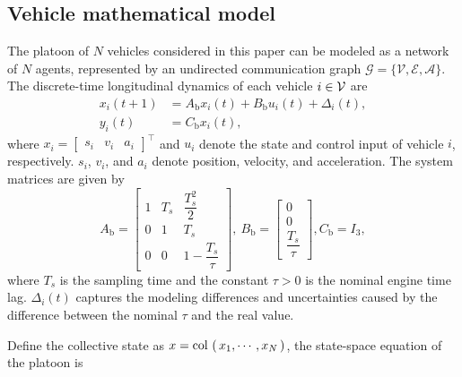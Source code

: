 \subsection{Vehicle mathematical model}\label{sec_vehiclemodel}
\vspace*{-0.3cm}
The platoon of $N$ vehicles considered in this paper can be modeled as a network of $N$ agents, represented by an undirected communication graph $\mathcal{G} = \{\mathcal{V}, \mathcal{E}, \mathcal{A}\}$.
The discrete-time longitudinal dynamics of each vehicle $i \in \mathcal{V}$ are
\begin{equation}\label{v_i}
    \begin{aligned}
        x_i(t+1) &= A_{\text{b}} x_i(t) + B_{\text{b}}u_{i}(t) + \Delta_i(t),\\
        y_i(t) &= C_{\text{b}} x_i(t),
    \end{aligned} 
\end{equation}
where $x_i=\begin{bmatrix} s_i & v_i & a_i \end{bmatrix}^{\top}$ and $u_i$ denote the state and control input of vehicle $i$, respectively. $s_i$, $v_i$, and $a_i$ denote position, velocity, and acceleration. The system matrices are given by 
\begin{equation*}
    A_{\text{b}}  =\begin{bmatrix}
    1 & T_s & \dfrac{T^2_s}{2} \\
    0 & 1 & T_s \\
    0 &  0 & 1 - \dfrac{T_s}{\tau}
        \end{bmatrix}, \
    B_{\text{b}} =\begin{bmatrix}
    0 \\
    0 \\
    \dfrac{T_s}{\tau}
        \end{bmatrix}, 
    C_{\text{b}} = I_{3}, 
\end{equation*}
where $T_s$ is the sampling time and the constant $\tau>0$ is the nominal engine time lag. $\Delta_i(t)$ captures the modeling differences and uncertainties caused by the difference between the nominal $\tau$ and the real value. 

Define the collective state as $x = \mathop{{\rm col}\,\left(\,x_{1}, \cdots , x_{N}\,\right)}$, the state-space equation of the platoon is 


